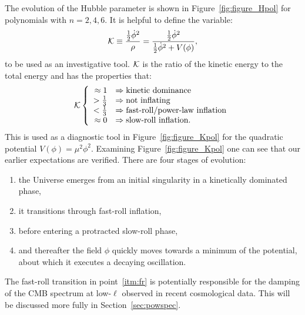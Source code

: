 The evolution of the Hubble parameter is shown in Figure~\ref{fig:figure_Hpol} for polynomials with $n=2,4,6$. It is helpful to define the variable:
%
\begin{equation}
  \mathcal{K} 
  \equiv  
  \frac{\frac{1}{2}\dot{\phi}^2  }{\rho}  
  =  
  \frac{\frac{1}{2}\dot{\phi}^2  }
  {\frac{1}{2}\dot{\phi}^2 + V(\phi)},
\end{equation}
%
to be used as an investigative tool. $\mathcal{K}$ is the ratio of the kinetic energy to the total energy and has the properties that:
%
\begin{equation}
  \Kfrac 
    \left\{
    \begin{array}{rl}
      \approx 1 &\Rightarrow \hbox{kinetic dominance} 
      \\
      >\frac{1}{3} &\Rightarrow \hbox{not inflating}
      \\
      <\frac{1}{3} &\Rightarrow \hbox{fast-roll/power-law inflation}
      \\
      \approx 0 &\Rightarrow \hbox{slow-roll inflation.}
    \end{array}
%
    \right.
\end{equation}
%
This is used as a diagnostic tool in Figure~\ref{fig:figure_Kpol} for the quadratic potential $V(\phi) = \mu^2\phi^2$. Examining Figure~\ref{fig:figure_Kpol} one can see that our earlier expectations are verified. There are four stages of evolution:
%
\begin{enumerate}
  \item the Universe emerges from an initial singularity in a
    kinetically dominated phase,
  \item it transitions through fast-roll inflation,\label{itm:fr}
  \item before entering a protracted slow-roll phase, 
  \item and thereafter the field $\phi$ quickly moves towards a minimum of the potential, about which it executes a decaying oscillation.
\end{enumerate}
%
The fast-roll transition in point~\eqref{itm:fr} is potentially responsible for the damping of the CMB spectrum at low-$\ell$ observed in recent cosmological data. This will be discussed more fully in Section~\ref{sec:powspec}.


